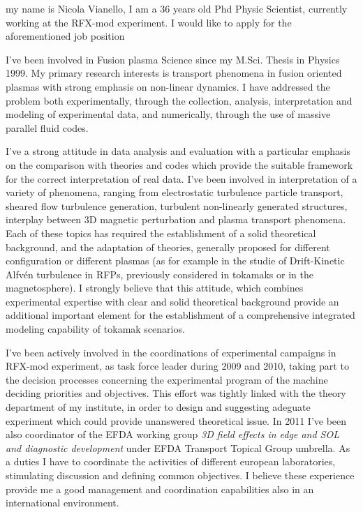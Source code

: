 \documentclass[11pt,stdletter,dateno,sigleft]{newlfm}
\begin{document}
\begin{newlfm}
my name is Nicola Vianello, I am a 36 years old Phd Physic Scientist,
currently working at the RFX-mod experiment. I would like to apply for
the aforementioned job position

I've been involved in Fusion plasma Science since my M.Sci. Thesis in
Physics 1999. My primary research interests is transport phenomena in fusion
oriented plasmas with strong emphasis on non-linear dynamics. I have
addressed the problem both experimentally, through the collection, 
analysis, interpretation and modeling of experimental data, and
numerically, through the use of massive parallel fluid codes. 

I've a strong attitude in
data analysis and evaluation with a particular emphasis on the
comparison with theories and codes which provide the suitable framework for the
correct interpretation of real data. I've been involved in
interpretation of a variety of phenomena, ranging from electrostatic
turbulence particle transport, sheared flow turbulence generation,
turbulent non-linearly generated structures, interplay between 3D
magnetic perturbation and plasma transport phenomena. Each of these
topics has required the establishment of a solid theoretical
background, and the adaptation of theories, generally proposed for
different configuration or different plasmas (as for example in the
studie of Drift-Kinetic Alfv\'en turbulence in RFPs, previously
considered in tokamaks or in the magnetosphere). I strongly believe that this
attitude, which combines experimental expertise  with clear and solid
theoretical background provide an additional important element for the
establishment of a comprehensive integrated modeling capability of
tokamak scenarios. 

I've been actively involved in the coordinations of experimental
campaigns in RFX-mod experiment, as task force leader during 2009 and
2010, taking part to the decision processes concerning the
experimental program of the machine deciding priorities and
objectives. This effort was tightly linked with the theory department
of my institute, in order to design and suggesting adeguate experiment
which could provide unanswered theoretical issue.
In 2011 I've been also coordinator of the 
EFDA working group \emph{3D field effects in
  edge and SOL and diagnostic development} under EFDA Transport
Topical Group umbrella. As a duties I have to coordinate the
activities of different  european laboratories, stimulating
discussion and defining common objectives. I believe these experience
provide me a good management and coordination capabilities also in an
international environment. 


\end{newlfm}
\end{document}
